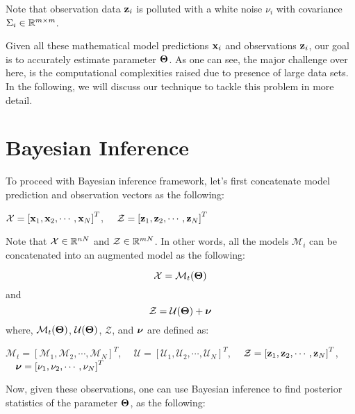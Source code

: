 \documentclass[]{article}
\begin{document}
Note that observation data $\mathbf{z}_i$ is polluted with a white noise $\nu_i$ with covariance $\Sigma_i\in\mathbb R^{m\times m}$.

Given all these mathematical model predictions $\mathbf{x}_i$ and observations $\mathbf{z}_i$, our goal is to accurately estimate parameter $\boldsymbol{\Theta}$. As one can see, the major challenge over here, is the computational complexities raised due to presence of large data sets. In the following, we will discuss our technique to tackle this problem in more detail.


\section*{Bayesian Inference}\label{sec:bayes}
To proceed with Bayesian inference framework, let's first concatenate model prediction and observation vectors as the following:
\vspace{0.2in}

\begin{center}
$\mathcal{X}=\left[\mathbf{x}_1,\mathbf{x}_2,\cdots,\mathbf{x}_N\right]^T$, $\quad \mathcal{Z}=\left[\mathbf{z}_1,\mathbf{z}_2,\cdots,\mathbf{z}_N\right]^T$
\end{center}
\vspace{0.2in}


Note that $\mathcal{X}\in \mathbb R^{nN}$ and $\mathcal{Z}\in \mathbb R^{mN}$. In other words, all the models $\mathcal{M}_i$ can be concatenated into an augmented model as the following:

\begin{equation}\label{model_aug}
\mathcal{X}=\mathcal{M}_t(\boldsymbol{\Theta})
\end{equation}
and 
\begin{equation}\label{obsmodel_aug}
\mathcal{Z}=\mathcal{U}(\boldsymbol{\Theta})+\boldsymbol{\nu}
\end{equation}
where, $\mathcal{M}_t(\boldsymbol{\Theta})$, $\mathcal{U}(\boldsymbol{\Theta})$, $\mathcal{Z}$, and $\boldsymbol{\nu}$ are defined as:
\vspace{0.2in}

\begin{center}
$\mathcal{M}_t=\left[\mathcal{M}_1,\mathcal{M}_2,\cdots,\mathcal{M}_N\right]^T$, $\quad \mathcal{U}=\left[
\mathcal{U}_1,\mathcal{U}_2,\cdots,\mathcal{U}_N\right]^T$, $\quad \mathcal{Z}=\left[\mathbf{z}_1,\mathbf{z}_2,\cdots,\mathbf{z}_N\right]^T$, $\quad
\boldsymbol{\nu}=\left[\nu_1,\nu_2,\cdots,\nu_N\right]^T$
\end{center}
\vspace{0.2in}


Now, given these observations, one can use Bayesian inference to find posterior statistics of the parameter $\boldsymbol{\Theta}$, as the following:
\end{document}
